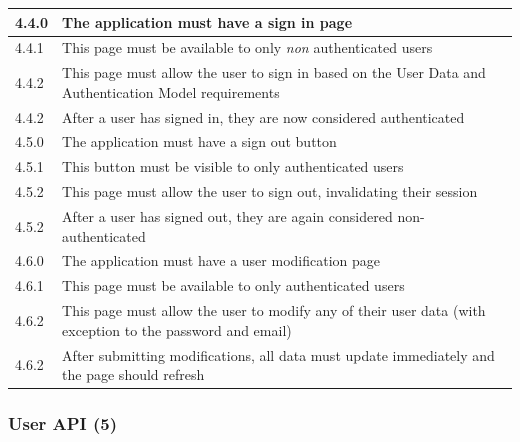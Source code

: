 \documentclass[12pt]{article}
\begin{document}
\begin{tabular}{|l|p{8cm}|}
    \hline\hline
    4.4.0              & The application must have a sign in page                                                                        \\
    \hline
    4.4.1              & This page must be available to only \textit{non} authenticated users                                            \\
    \hline
    4.4.2              & This page must allow the user to sign in based on the User Data and Authentication Model requirements           \\
    \hline
    4.4.2              & After a user has signed in, they are now considered authenticated                                               \\
    \hline

    \hline\hline
    4.5.0              & The application must have a sign out button                                                                     \\
    \hline
    4.5.1              & This button must be visible to only authenticated users                                                         \\
    \hline
    4.5.2              & This page must allow the user to sign out, invalidating their session                                           \\
    \hline
    4.5.2              & After a user has signed out, they are again considered non-authenticated                                        \\
    \hline

    \hline\hline
    4.6.0              & The application must have a user modification page                                                              \\
    \hline
    4.6.1              & This page must be available to only authenticated users                                                         \\
    \hline
    4.6.2              & This page must allow the user to modify any of their user data (with exception to the password and email)       \\
    \hline
    4.6.2              & After submitting modifications, all data must update immediately and the page should refresh                    \\
    \hline
\end{tabular}

\subsubsection{User API (5)}
\end{document}
